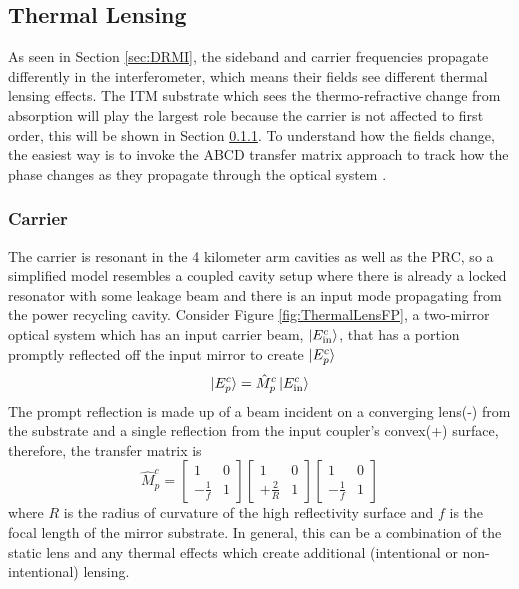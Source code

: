 	\subsection{Thermal Lensing}\label{Sec:TL_lensing}
	As seen in Section \ref{sec:DRMI}, the sideband and carrier frequencies propagate differently in the interferometer, which means their fields see different thermal lensing effects.  The ITM substrate which sees the thermo-refractive change from absorption will play the largest role because the carrier is not affected to first order, this will be shown in Section \ref{Sec:carrier_lensing}. To understand how the fields change, the easiest way is to invoke the ABCD transfer matrix approach to track how the phase changes as they propagate through the optical system \cite{Lawrence_TCS}.
		\subsubsection{Carrier}\label{Sec:carrier_lensing}
		The carrier is resonant in the 4 kilometer arm cavities as well as the PRC, so a simplified model resembles a coupled cavity setup where there is already a locked resonator with some leakage beam and there is an input mode propagating from the power recycling cavity.  Consider Figure \ref{fig:ThermalLensFP}, a two-mirror optical system which has an input carrier beam, $\ket{E^c_{\text{in}}}$, that has a portion promptly reflected off the input mirror to create $\ket{E^c_{p}}$
		\begin{equation}
		\ket{E^{c}_{p}} = \hat{M}^{c}_{p} \ket{E^{c}_{\text{in}}}
		\end{equation}
		The prompt reflection is made up of a beam incident on a converging lens(-) from the substrate and a single reflection from the input coupler's convex(+) surface, therefore, the transfer matrix is
		\begin{equation}
		\hat{M}^{c}_{p} = 
		\begin{bmatrix}
						1 	&	0 
		\\ 	-\frac{1}{f} 	&	1
		\end{bmatrix}
		\begin{bmatrix}
						1 	&	0 
		\\ 	+\frac{2}{R} 	&	1
		\end{bmatrix}
		\begin{bmatrix}
						1 	&	0 
		\\ 	-\frac{1}{f} 	&	1
		\end{bmatrix}
		\end{equation}
		where $R$ is the radius of curvature of the high reflectivity surface and $f$ is the focal length of the mirror substrate. In general, this can be a combination of the static lens and any thermal effects which create additional (intentional or non-intentional) lensing.
		

